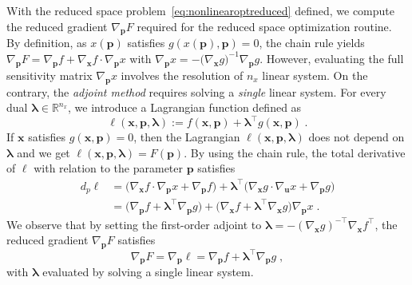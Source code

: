 With the reduced space problem~\eqref{eq:nonlinearoptreduced} defined,
we compute the reduced gradient $\nabla_{\bm{p}} F$ required for the reduced space optimization routine.
By definition, as $x(\bm{p})$ satisfies $g(x(\bm{p}), \bm{p}) = 0$, the chain rule yields
$\nabla_{\bm{p}} F = \nabla_{\bm{p}} f + \nabla_{\bm{x}} f \cdot \nabla_{\bm{p}} x$
with
$\nabla_{\bm{p}} x= - \big(\nabla_{\bm{x}}g)^{-1} \nabla_{\bm{p}}g$.
However, evaluating the full sensitivity matrix $\nabla_{\bm{p}} x$ involves the
resolution of $n_x$ linear system.
On the contrary, the \emph{adjoint method} requires solving a
\emph{single} linear system.
For every dual $\bm{\lambda} \in \mathbb{R}^{n_x}$, we introduce a
Lagrangian function defined as
\begin{equation}
  \label{eq:lagrangian}
 \ell(\bm{x}, \bm{p}, \bm{\lambda}) := f(\bm{x}, \bm{p}) + \bm{\lambda}^\top g(\bm{x}, \bm{p})
 \; .
\end{equation}
If $\bm{x}$ satisfies $g(\bm{x}, \bm{p}) = 0$, then the Lagrangian $\ell(\bm{x},
\bm{p}, \bm{\lambda})$ does not depend on $\bm{\lambda}$ and we
get $\ell(\bm{x}, \bm{p}, \bm{\lambda}) = F(\bm{p})$. By
using the chain rule, the total derivative of $\ell$
with relation to the parameter $\bm{p}$ satisfies
\begin{equation*}
  \begin{aligned}
    d_p \ell &= \big(\nabla_{\bm{x}} f \cdot \nabla_{\bm{p}} x +
    \nabla_{\bm{p}} f  \big) +
    \bm{\lambda}^\top \big(\nabla_{\bm{x}} g \cdot \nabla_{\bm u} x +
    \nabla_{\bm{p}} g \big)  \\
             &= \big(\nabla_{\bm{p}} f + \bm{\lambda}^\top \nabla_{\bm{p}} g \big) +
             \big(\nabla_{\bm{x}} f + \bm{\lambda}^\top\nabla_{\bm{x}} g \big) \nabla_{\bm{p}} x  \;.
  \end{aligned}
\end{equation*}
We observe that
by setting the first-order adjoint to $\bm{\lambda} = - (\nabla_{\bm{x}}g)^{-\top}\nabla_{\bm{x}} f^\top$,
the reduced gradient $\nabla_{\bm{p}} F$ satisfies
\begin{equation}
  \label{eq:reduced_gradient}
  \nabla_{\bm{p}} F =
  \nabla_{\bm{p}} \ell =
  \nabla_{\bm{p}} f +
  \bm{\lambda}^\top \nabla_{\bm{p}} g
  \; ,
\end{equation}
with $\bm{\lambda}$ evaluated by solving a single linear system.
